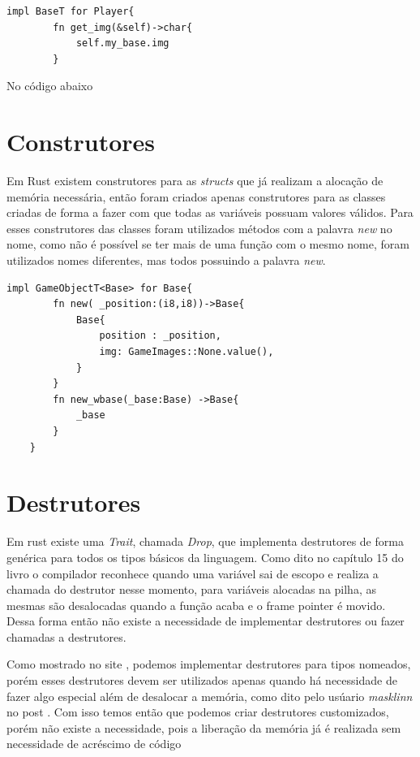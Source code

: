 \documentclass[rel_mlp]{iiufrgs}
\begin{document}
  \begin{lstlisting}[frame = single]
    impl BaseT for Player{
        fn get_img(&self)->char{
            self.my_base.img
        }
  \end{lstlisting}
  No código abaixo
  
 
\section{Construtores}
 Em Rust existem construtores para as \textit{structs} que já realizam a alocação de memória necessária, então foram criados apenas construtores para as classes criadas de forma a fazer com que todas as variáveis possuam valores válidos. Para esses construtores das classes foram utilizados métodos com a palavra \textit{new} no nome, como não é possível se ter mais de uma função com o mesmo nome, foram utilizados nomes diferentes, mas todos possuindo a palavra \textit{new}. 
 
 \begin{lstlisting}[frame =single]
    impl GameObjectT<Base> for Base{
        fn new( _position:(i8,i8))->Base{
            Base{
                position : _position,
                img: GameImages::None.value(),
            }                        
        }
        fn new_wbase(_base:Base) ->Base{
            _base
        }
    }
 \end{lstlisting}
 
 \section{Destrutores}
 Em rust existe uma \textit{Trait}, chamada \textit{Drop}, que implementa destrutores de forma genérica para todos os tipos básicos da linguagem. Como dito no capítulo 15 do livro \citet{thebook} o compilador reconhece quando uma variável sai de escopo e realiza a chamada do destrutor nesse momento, para variáveis alocadas na pilha, as mesmas são desalocadas quando a função acaba e o frame pointer é movido. Dessa forma então não existe a necessidade de implementar destrutores ou fazer chamadas a destrutores.
 
 Como mostrado no site \citet{Drop101}, podemos implementar destrutores para tipos nomeados, porém esses destrutores devem ser utilizados apenas quando há necessidade de fazer algo especial além de desalocar a memória, como dito pelo usúario \textit{masklinn} no post \citet{Dropredd}. Com isso temos então que podemos criar destrutores customizados, porém não existe a necessidade, pois a liberação da memória já é realizada sem necessidade de acréscimo de código
 
\end{document}
